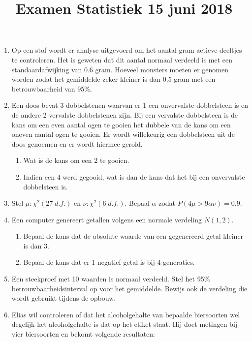 \documentclass{article}
\title{Examen Statistiek 15 juni 2018}
\author{}
\date{}
\begin{document}
\maketitle
 \begin{enumerate}
  \item Op een stof wordt er analyse uitgevoerd om het aantal gram actieve deeltjes te controleren. Het is geweten dat dit aantal normaal verdeeld is met een standaardafwijking van 0.6 gram. Hoeveel monsters moeten er genomen worden zodat het gemiddelde zeker kleiner is dan 0.5 gram met een betrouwbaarheid van 95\%.
  \item Een doos bevat 3 dobbelstenen waarvan er 1 een onvervalste dobbelsteen is en de andere 2 vervalste dobbelstenen zijn. Bij een vervalste dobbelsteen is de kans om een even aantal ogen te gooien het dubbele van de kans om een oneven aantal ogen te gooien. Er wordt willekeurig een dobbelsteen uit de doos genoemen en er wordt hiermee gerold.
    \begin{enumerate}
        \item Wat is de kans om een 2 te gooien.
        \item Indien een 4 werd gegooid, wat is dan de kans dat het bij een onvervalste dobbelsteen is.
    \end{enumerate}
  
  \item Stel $\mu: \chi^2(27\; d.f.)$ en $\nu: \chi^2(6\;d.f.)$. Bepaal $\alpha$ zodat $P(4\mu > 9\alpha\nu) = 0.9$.
  
  \item Een computer genereert getallen volgens een normale verdeling $N(1, 2)$. 
    \begin{enumerate}
        \item Bepaal de kans dat de absolute waarde van een gegenereerd getal kleiner is dan 3.
        \item Bepaal de kans dat er 1 negatief getal is bij 4 generaties.
    \end{enumerate}
  
  \item Een steekproef met 10 waarden is normaal verdeeld. Stel het 95$\%$ betrouwbaarheidsinterval op voor het gemiddelde. Bewijs ook de verdeling die wordt gebruikt tijdens de opbouw.
  
  \item Elias wil controleren of dat het alcoholgehalte van bepaalde biersoorten wel degelijk het alcoholgehalte is dat op het etiket staat. Hij doet metingen bij vier biersoorten en bekomt volgende resultaten:
  

\end{enumerate}
\end{document}
